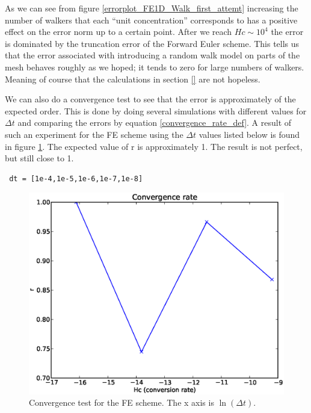 As we can see from figure \ref{errorplot_FE1D_Walk_first_attemt} increasing the number of walkers that each ``unit concentration'' corresponds to has a positive effect on the error norm up to a certain point. 
After we reach $Hc \sim 10^4$ the error is dominated by the truncation error of the Forward Euler scheme. 
This tells us that the error associated with introducing a random walk model on parts of the mesh behaves roughly as we hoped; it tends to zero for large numbers of walkers. 
Meaning of course that the calculations in section \ref{} are not hopeless.

We can also do a convergence test to see that the error is approximately of the expected order. 
This is done by doing several simulations with different values for $\Delta t$ and comparing the errors by equation \ref{convergence_rate_def}. 
A result of such an experiment for the FE scheme using the $\Delta t$ values listed below is found in figure \ref{convergence_test_FE}. 
The expected value of r is approximately 1. The result is not perfect, but still close to 1.
\begin{lstlisting}
 dt = [1e-4,1e-5,1e-6,1e-7,1e-8]
\end{lstlisting}
\begin{figure}[H]
 \centering
 \includegraphics[scale=0.7]{../doc/results/experiment_27112013_1017/results/ConvergenceTest.eps}
 \caption{Convergence test for the FE scheme. The x axis is $\ln(\Delta t)$.}
 \label{convergence_test_FE}
\end{figure}
